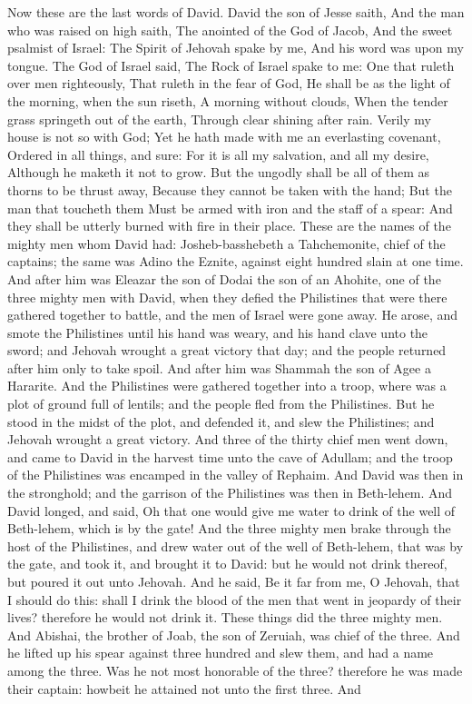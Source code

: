 Now these are the last words of David. David the son of Jesse saith, And the man who was raised on high saith, The anointed of the God of Jacob, And the sweet psalmist of Israel:  The Spirit of Jehovah spake by me, And his word was upon my tongue.  The God of Israel said, The Rock of Israel spake to me: One that ruleth over men righteously, That ruleth in the fear of God,  He shall be as the light of the morning, when the sun riseth, A morning without clouds, When the tender grass springeth out of the earth, Through clear shining after rain.  Verily my house is not so with God; Yet he hath made with me an everlasting covenant, Ordered in all things, and sure: For it is all my salvation, and all my desire, Although he maketh it not to grow.  But the ungodly shall be all of them as thorns to be thrust away, Because they cannot be taken with the hand;  But the man that toucheth them Must be armed with iron and the staff of a spear: And they shall be utterly burned with fire in their place.  These are the names of the mighty men whom David had: Josheb-basshebeth a Tahchemonite, chief of the captains; the same was Adino the Eznite, against eight hundred slain at one time.  And after him was Eleazar the son of Dodai the son of an Ahohite, one of the three mighty men with David, when they defied the Philistines that were there gathered together to battle, and the men of Israel were gone away. He arose, and smote the Philistines until his hand was weary, and his hand clave unto the sword; and Jehovah wrought a great victory that day; and the people returned after him only to take spoil.  And after him was Shammah the son of Agee a Hararite. And the Philistines were gathered together into a troop, where was a plot of ground full of lentils; and the people fled from the Philistines. But he stood in the midst of the plot, and defended it, and slew the Philistines; and Jehovah wrought a great victory.  And three of the thirty chief men went down, and came to David in the harvest time unto the cave of Adullam; and the troop of the Philistines was encamped in the valley of Rephaim. And David was then in the stronghold; and the garrison of the Philistines was then in Beth-lehem. And David longed, and said, Oh that one would give me water to drink of the well of Beth-lehem, which is by the gate! And the three mighty men brake through the host of the Philistines, and drew water out of the well of Beth-lehem, that was by the gate, and took it, and brought it to David: but he would not drink thereof, but poured it out unto Jehovah. And he said, Be it far from me, O Jehovah, that I should do this: shall I drink the blood of the men that went in jeopardy of their lives? therefore he would not drink it. These things did the three mighty men.  And Abishai, the brother of Joab, the son of Zeruiah, was chief of the three. And he lifted up his spear against three hundred and slew them, and had a name among the three. Was he not most honorable of the three? therefore he was made their captain: howbeit he attained not unto the first three.  And 